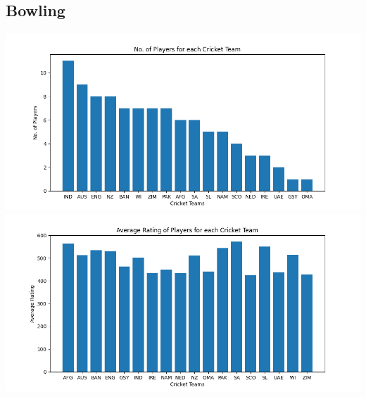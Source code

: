 \documentclass{article}
\begin{document}
\begin{normalsize}
            \subsection{Bowling}\label{subsec:bowling1}
                \includegraphics[scale=0.7]{t20i_bowling-1}
                \vspace{1em}\\
                \includegraphics[scale=0.7]{t20i_bowling-2}

\end{normalsize}
\end{document}
